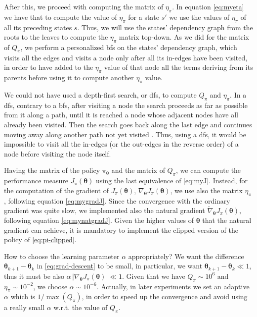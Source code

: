 After this, we proceed with computing the matrix of $\eta_\pi$. In equation \eqref{eq:myeta} we have that to compute the value of $\eta_\pi$ for a state $s'$ we use the values of $\eta_\pi$ of all its preceding states $s$. Thus, we will use the states' dependency graph from the roots to the leaves to compute the $\eta_\pi$ matrix top-down. As we did for the matrix of $Q_\pi$, we perform a personalized \acrshort{bfs} on the states' dependency graph, which visits all the edges and visits a node only after all its in-edges have been visited, in order to have added to the $\eta_\pi$ value of that node all the terms deriving from its parents before using it to compute another $\eta_\pi$ value.

We could not have used a depth-first search, or \acrshort{dfs}, to compute $Q_\pi$ and $\eta_\pi$. In a \acrshort{dfs}, contrary to a \acrshort{bfs}, after visiting a node the search proceeds as far as possible from it along a path, until it is reached a node whose adjacent nodes have all already been visited. Then the search goes back along the last edge and continues moving away along another path not yet visited \cite{Montresor2014}. Thus, using a \acrshort{dfs}, it would be impossible to visit all the in-edges (or the out-edges in the reverse order) of a node before visiting the node itself.

Having the matrix of the policy $\pi_{\boldsymbol \theta}$ and the matrix of $Q_\pi$, we can compute the performance measure $J_\pi (\boldsymbol \theta)$ using the last equivalence of \eqref{eq:myJ}. Instead, for the computation of the gradient of $J_\pi (\boldsymbol \theta)$, $\nabla_{\boldsymbol \theta} J_\pi (\boldsymbol \theta)$, we use also the matrix $\eta_\pi$, following equation \eqref{eq:mygradJ}. Since the convergence with the ordinary gradient was quite slow, we implemented also the natural gradient $\widetilde \nabla_{\boldsymbol \theta} J_\pi (\boldsymbol \theta)$, following equation \eqref{eq:mynatgradJ}. Given the higher values of $\boldsymbol \theta$ that the natural gradient can achieve, it is mandatory to implement the clipped version of the policy of \eqref{eq:pi-clipped}.

How to choose the learning parameter $\alpha$ appropriately? We want the difference $\boldsymbol \theta_{k+1} - \boldsymbol \theta_k$ in \eqref{eq:grad-descent} to be small, in particular, we want $\boldsymbol \theta_{k+1} - \boldsymbol \theta_k \ll 1$, thus it must be also $\alpha \, |\nabla_{\boldsymbol \theta} J_\pi (\boldsymbol \theta)| \ll 1$. Given that we have $Q_\pi \sim 10^6$ and $\eta_\pi \sim 10^{-2}$, we choose $\alpha \sim 10^{-6}$. Actually, in later experiments we set an adaptive $\alpha$ which is $1 / \max(Q_\pi)$, in order to speed up the convergence and avoid using a really small $\alpha$ w.r.t. the value of $Q_\pi$.

